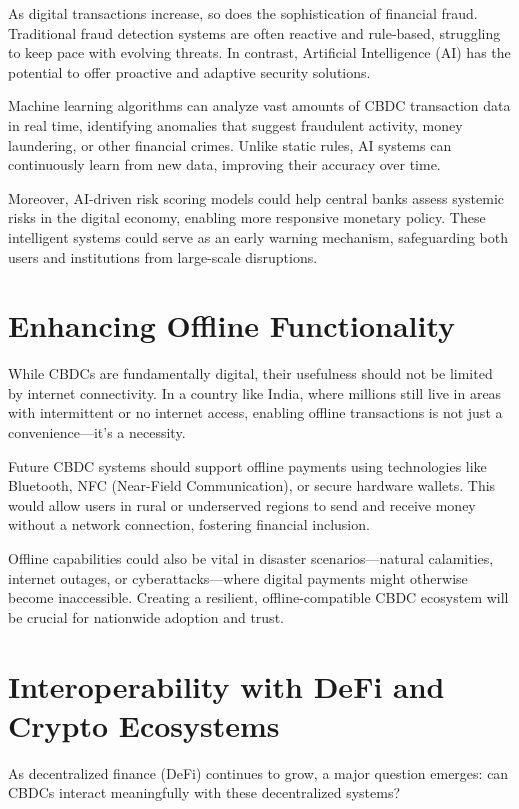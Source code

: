 As digital transactions increase, so does the sophistication of financial fraud. Traditional fraud detection systems are often reactive and rule-based, struggling to keep pace with evolving threats. In contrast, Artificial Intelligence (AI) has the potential to offer proactive and adaptive security solutions.

Machine learning algorithms can analyze vast amounts of CBDC transaction data in real time, identifying anomalies that suggest fraudulent activity, money laundering, or other financial crimes. Unlike static rules, AI systems can continuously learn from new data, improving their accuracy over time.

Moreover, AI-driven risk scoring models could help central banks assess systemic risks in the digital economy, enabling more responsive monetary policy. These intelligent systems could serve as an early warning mechanism, safeguarding both users and institutions from large-scale disruptions.

\section{Enhancing Offline Functionality}

While CBDCs are fundamentally digital, their usefulness should not be limited by internet connectivity. In a country like India, where millions still live in areas with intermittent or no internet access, enabling offline transactions is not just a convenience—it’s a necessity.

Future CBDC systems should support offline payments using technologies like Bluetooth, NFC (Near-Field Communication), or secure hardware wallets. This would allow users in rural or underserved regions to send and receive money without a network connection, fostering financial inclusion.

Offline capabilities could also be vital in disaster scenarios—natural calamities, internet outages, or cyberattacks—where digital payments might otherwise become inaccessible. Creating a resilient, offline-compatible CBDC ecosystem will be crucial for nationwide adoption and trust.
\clearpage
\section{Interoperability with DeFi and Crypto Ecosystems}

As decentralized finance (DeFi) continues to grow, a major question emerges: can CBDCs interact meaningfully with these decentralized systems?

